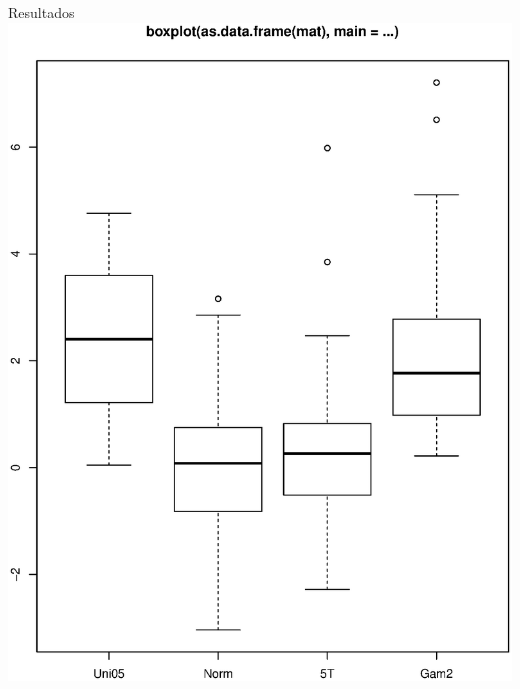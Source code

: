 \documentclass[11pt]{beamer}
\begin{document}
\begin{frame}{Resultados}
\includegraphics[scale=0.5]{b}

\end{frame}
\end{document}
